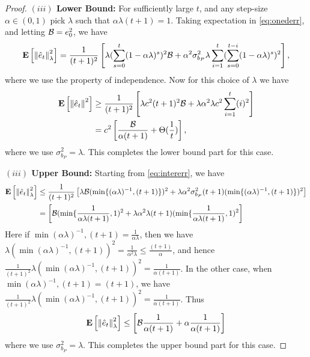 \begin{proof}
\textbf{$(iii)$ Lower Bound:}
For sufficiently large $t$, and any step-size$\alpha \in (0,1)$ pick $\lambda$ such that $\alpha \lambda (t+1)=1$. Taking expectation in \eqref{eq:onederr}, and letting $\mathcal{B}=e_0^2$, we have
\begin{align}\label{eq:intererr}
\mathbf{E}\left[\left\| \hat{e}_t\right\|^2_{\lambda}\right]=\frac{1}{(t+1)^2}\left[ \lambda (\sum_{s=0}^t(1-\alpha \lambda)^s)^2 \mathcal{B}+ \alpha^2\sigma^2_{b_P}\lambda \sum_{i=1}^t (\sum_{s=0}^{t-i} (1-\alpha \lambda)^s)^2\right],
\end{align}
where we use the property of independence. Now for this choice of $\lambda$ we have
\begin{align}
\mathbf{E}\left[\left\| \hat{e}_t\right\|^2\right]&\geq \frac{1}{(t+1)^2}\left[ \lambda c^2(t+1)^2 \mathcal{B}+ \lambda \alpha^2 \lambda c^2\sum_{i=1}^t (i)^2\right]\\
&= c^2\left[\frac{\mathcal{B}}{\alpha (t+1)}+   \Theta(\frac{1}{t}) \right],
\end{align}
where we use $\sigma^2_{b_P}=\lambda$. This completes the lower bound part for this case.

\textbf{$(iii)$ Upper Bound:}
Starting from \eqref{eq:intererr}, we have
\begin{align}
\mathbf{E}\left[\left\| \hat{e}_t\right\|^2_{\lambda}\right]&\leq \frac{1}{(t+1)^2}\left[\lambda \mathcal{B} (\min\{(\alpha\lambda)^{-1},(t+1)\})^2+ \lambda \alpha^2 \sigma^2_{b_P} (t+1) (\min\{(\alpha\lambda)^{-1},(t+1)\})^2 \right]\\
&= \left[\mathcal{B} (\min\{\frac{1}{\alpha \lambda (t+1)},1)^2+ \lambda \alpha^2 \lambda (t+1) (\min\{\frac{1}{\alpha \lambda (t+1)},1)^2 \right]\\
\end{align}
Here if $\min{(\alpha\lambda)^{-1},(t+1)}=\frac{1}{\alpha \lambda}$, then we have $\lambda(\min{(\alpha\lambda)^{-1},(t+1)})^2=\frac{1}{\alpha^2 \lambda}\leq \frac{(t+1)}{\alpha}$, and hence $\frac{1}{(t+1)^2}\lambda(\min{(\alpha\lambda)^{-1},(t+1)})^2=\frac{1}{\alpha (t+1)}$. In the other case, when $\min{(\alpha\lambda)^{-1},(t+1)}=(t+1)$, we have
$\frac{1}{(t+1)^2}\lambda(\min{(\alpha\lambda)^{-1},(t+1)})^2=\frac{1}{\alpha (t+1)}$. Thus
\begin{align}
\mathbf{E}\left[\left\| \hat{e}_t\right\|^2_{\lambda}\right]&\leq \left[\mathcal{B} \frac{1}{\alpha (t+1)}+ \alpha \frac{1}{\alpha (t+1)} \right]\\
\end{align}
where we use $\sigma^2_{b_P}=\lambda$. This completes the upper bound part for this case.
\end{proof}
